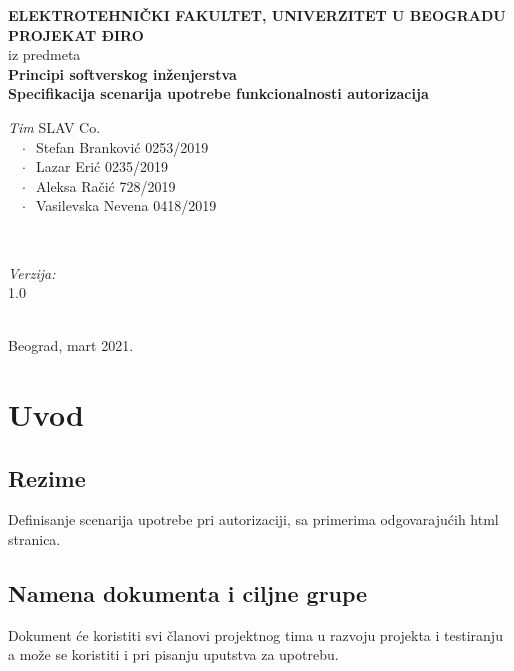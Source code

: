 \documentclass[12pt]{article}
\begin{document}
    \renewcommand{\labelenumii}{\arabic{enumi}.\arabic{enumii}}
	\begin{titlepage}  
		\center
		\textbf{ \LARGE ELEKTROTEHNIČKI FAKULTET, UNIVERZITET U BEOGRADU } \\[4cm]
		\textbf{ \Large PROJEKAT ĐIRO\texttrademark} \\[0.3cm]
		iz predmeta \\[0.3cm]
		\textbf{ \Large Principi softverskog inženjerstva} \\[0.7cm]
		{ \huge \bfseries Specifikacija scenarija upotrebe funkcionalnosti autorizacija } \\[6cm]
		

		\begin{minipage}{0.5\textwidth}
			\begin{flushleft}
				\large
				\emph{Tim} SLAV Co. \\
			     $\;\;\; \cdot \;\;$Stefan Branković  0253/2019\\
			     $\;\;\; \cdot \;\;$Lazar Erić 0235/2019\\
			     $\;\;\; \cdot \;\;$Aleksa Račić 728/2019\\
			     $\;\;\; \cdot \;\;$Vasilevska Nevena 0418/2019
			\end{flushleft}
		\end{minipage}
		~
		\begin{minipage}{0.4\textwidth}
			\begin{flushright}
				\large
				\emph{Verzija:} \\
				1.0
			\end{flushright}
		\end{minipage} \\[2cm]
		\enlargethispage{4\baselineskip}
		{ \large Beograd, mart 2021. }
		\vfill
	\end{titlepage}
\pagebreak
\tableofcontents
\pagebreak



\section{Uvod}
\subsection{Rezime}
Definisanje scenarija upotrebe pri autorizaciji, sa primerima odgovarajućih html stranica.
\subsection{Namena dokumenta i ciljne grupe}
Dokument će koristiti svi članovi projektnog tima u razvoju projekta i testiranju a može se koristiti i pri pisanju uputstva za
upotrebu.
\end{document}
